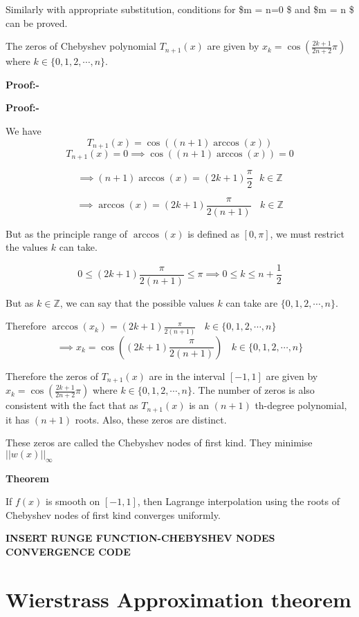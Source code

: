\documentclass[
]{book}
\begin{document}
Similarly with appropriate substitution, conditions for \$m = n=0 \$ and \$m = n  \$ can be proved.

The zeros of Chebyshev polynomial \(T_{n+1}(x)\) are given by \(x_k = \cos\left( \frac{2k+1}{2n+2} \pi \right)\) where \(k \in \{ 0,1,2,\cdots,n \}\).

\textbf{Proof:-}

\begin{flushleft}
\textbf{Proof:-}
\end{flushleft}

We have \[T_{n+1}(x) = \cos((n+1)\arccos(x))\]
\[T_{n+1}(x) = 0 \implies \cos((n+1)\arccos(x)) = 0\]

\[\implies(n+1) \arccos(x) = (2k+1)\frac{\pi}{2} \ \ \ k \in \mathbb{Z}\]

\[\implies \arccos(x) = (2k+1)\frac{\pi}{2(n+1)} \ \ \ \ k \in \mathbb{Z}\]

But as the principle range of \(\arccos(x)\) is defined as \([0,\pi]\), we must restrict the values \(k\) can take.

\[0 \le (2k+1)\frac{\pi}{2(n+1)} \le \pi \implies 0 \le k \le n+\frac{1}{2} \]

But as \(k \in \mathbb{Z}\), we can say that the possible values \(k\) can take are \(\{ 0,1,2,\cdots,n\}\).

Therefore \(\arccos(x_k) = (2k+1)\frac{\pi}{2(n+1)} \ \ \ \ k \in \{ 0,1,2,\cdots,n\}\)
\[\implies x_k = \cos\left( (2k+1)\frac{\pi}{2(n+1)} \right)\ \ \ \ k \in \{ 0,1,2,\cdots,n\}\]

Therefore the zeros of \(T_{n+1}(x)\) are in the interval \([-1,1]\) are given by \(x_k = \cos\left( \frac{2k+1}{2n+2} \pi \right)\) where \(k \in \{ 0,1,2,\cdots,n \}\). The number of zeros is also consistent with the fact that as \(T_{n+1}(x)\) is an \((n+1)\) th-degree polynomial, it has \((n+1)\) roots. Also, these zeros are distinct.

These zeros are called the Chebyshev nodes of first kind. They minimise \(||w(x)||_{\infty}\)

\textbf{Theorem}

If \(f(x)\) is smooth on \([-1,1]\), then Lagrange interpolation using the roots of Chebyshev nodes of first kind converges uniformly.

\textbf{INSERT RUNGE FUNCTION-CHEBYSHEV NODES CONVERGENCE CODE}

\hypertarget{wierstrass-approximation-theorem}{%
\section{Wierstrass Approximation theorem}\label{wierstrass-approximation-theorem}}
\end{document}
